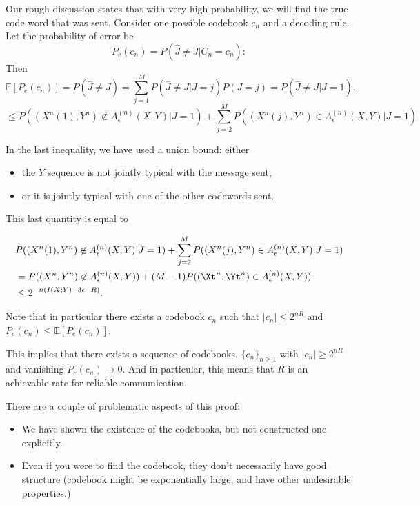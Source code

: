 \documentclass[13pt]{article}
\newcommand{\EE}{\mathbb{E}}
\newcommand{\eps}{\epsilon}
\begin{document}
Our rough discussion states that with very high probability, we will find the true code word that was sent.  Consider one possible codebook $c_n$ and a decoding rule.  Let the probability of error be 
\[
  P_e(c_n)  = P(\hat{J} \neq J | C_n = c_n): 
\]
Then
\[
  \EE [P_e(c_n)] = P(\hat{J} \neq J) = \sum_{j=1}^{M} P(\hat{J} \neq J | J = j) P(J = j) = P(\hat{J} \neq J | J = 1).
\]
\[
\leq P((X^n (1), Y^n) \not \in A_{\eps}^{(n)} (X, Y) | J = 1) + \sum_{j=2}^{M} P((X^n(j), Y^n) \in A_{\eps}^{(n)} (X, Y) | J = 1)
\]

In the last inequality, we have used a union bound: either 

\begin{itemize}
  \item  the $Y$ sequence is not jointly typical with the message sent, 
  \item or it is jointly typical with one of the other codewords sent.
\end{itemize}

This last quantity is equal to

\begin{align*}
  &  P((X^n (1), Y^n) \not \in A_{\eps}^{(n)} (X, Y) | J = 1) + \sum_{j=2}^{M} P((X^n(j), Y^n) \in A_{\eps}^{(n)} (X, Y) | J = 1) \\
    &= P ( (X^n, Y^n) \not \in A_{\eps}^{(n)} (X, Y)) + (M-1)P ((\Xt^n, \Yt^n) \in A_{\eps}^{(n)} (X, Y)) \\
    & \leq 2^{-n (I(X; Y) - 3 \eps - R)}.
\end{align*}

Note that in particular there exists a codebook $c_n$ such that $|c_n| \leq 2^{nR}$ and $P_e(c_n) \leq \EE [P_e(c_n)]$.

This implies that there exists a sequence of codebooks, $\{ c_n \}_{n \geq 1}$ with $|c_n| \geq 2^{nR}$ and vanishing $P_e(c_n) \to 0$.  And in particular, this means that $R$ is an achievable rate for reliable communication. \ep

There are a couple of problematic aspects of this proof:

\begin{itemize}
  \item We have shown the existence of the codebooks, but not constructed one explicitly.
  \item Even if you were to find the codebook, they don't necessarily have good structure (codebook might be exponentially large, and have other undesirable properties.)
\end{itemize}
\end{document}
